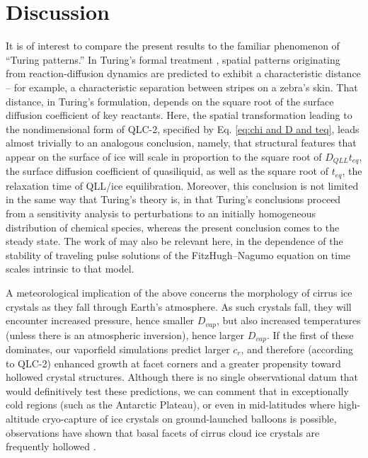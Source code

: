 \documentclass[draft]{agujournal2019}
\begin{document}
\section{Discussion}

It is of interest to compare the present results to the familiar phenomenon of ``Turing patterns.'' In Turing's formal treatment \cite{turing_chemical_1952}, spatial patterns originating from reaction-diffusion dynamics are predicted to exhibit a characteristic distance -- for example, a characteristic separation between stripes on a zebra's skin. That distance, in Turing's formulation, depends on the square root of the surface diffusion coefficient of key reactants. Here, the spatial transformation leading to the nondimensional form of QLC-2, specified by Eq. \ref{eq:chi and D and teq}, leads almost trivially to an analogous conclusion, namely, that structural features that appear on the surface of ice will scale in proportion to the square root of $D_{QLL}t_{eq}$, the surface diffusion coefficient of quasiliquid, as well as the square root of $t_{eq}$, the relaxation time of QLL/ice equilibration. Moreover, this conclusion is not limited in the same way that Turing's theory is, in that Turing’s conclusions proceed from a sensitivity analysis to perturbations to an initially homogeneous distribution of chemical species, whereas the present conclusion comes to the steady state. The work of \cite{arioli_existence_2015} may also be relevant here, in the dependence of the stability of traveling pulse solutions of the FitzHugh–Nagumo equation on time scales intrinsic to that model.

A meteorological implication of the above concerns the morphology of cirrus ice crystals as they fall through Earth’s atmosphere. As such crystals fall, they will encounter increased pressure, hence smaller $D_{vap}$, but also increased temperatures (unless there is an atmospheric inversion), hence larger $D_{vap}$. If the first of these dominates, our vaporfield simulations predict larger $c_r$, and therefore (according to QLC-2) enhanced growth at facet corners and a greater propensity toward hollowed crystal structures. Although there is no single observational datum that would definitively test these predictions, we can comment that in exceptionally cold regions (such as the Antarctic Plateau), or even in mid-latitudes where high-altitude cryo-capture of ice crystals on ground-launched balloons is possible, observations have shown that basal facets of cirrus cloud ice crystals are frequently hollowed \cite{magee_mesoscopic_2014,magee_captured_2020, walden_atmospheric_2003}. 
\end{document}
